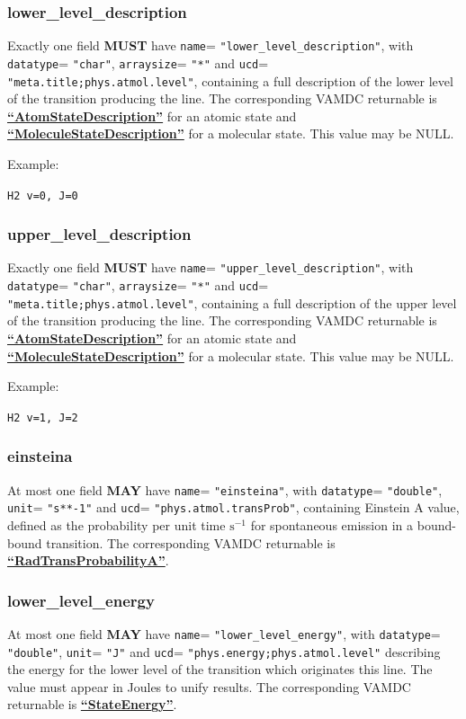 \documentclass[11pt,a4paper]{ivoa}
\def\attrval#1#2{\texttt{#1}\discretionary{}{}{}=\discretionary{}{}{}%
  \texttt{"#2"}}
\def\vamdcret#1{\href{https://dictionary.vamdc.eu/returnables/\##1}{\textbf{``\color{vamdccolor}#1''}}}
\begin{document}
\subsubsection{lower\_level\_description}

Exactly one field \textbf{MUST} have \attrval{name}{lower\_level\_description}, with \attrval{datatype}{char}, \attrval{arraysize}{*}
and \attrval{ucd}{meta.title;phys.atmol.level}, containing a full description of the lower level of the transition producing the line.
The corresponding VAMDC returnable is \vamdcret{AtomStateDescription}
for an atomic state and \vamdcret{MoleculeStateDescription} for a molecular state.
This value may be NULL.

Example:

\verb|H2 v=0, J=0|

\subsubsection{upper\_level\_description}

Exactly one field \textbf{MUST} have \attrval{name}{upper\_level\_description}, with \attrval{datatype}{char}, \attrval{arraysize}{*}
and \attrval{ucd}{meta.title;phys.atmol.level}, containing a full description of the upper level of the transition producing the line.
The corresponding VAMDC returnable is \vamdcret{AtomStateDescription}
for an atomic state and  \vamdcret{MoleculeStateDescription} for a molecular state.
This value may be NULL.

Example:

\verb|H2 v=1, J=2|

\subsubsection{einsteina}
At most one field \textbf{MAY} have \attrval{name}{einsteina}, with
\attrval{datatype}{double}, \attrval{unit}{s**-1} and \attrval{ucd}{phys.atmol.transProb}, containing Einstein A value,
defined as the probability per unit time $\textrm{s}^{-1}$ for spontaneous emission in a bound-bound transition.
The corresponding VAMDC returnable is \vamdcret{RadTransProbabilityA}.

\subsubsection{lower\_level\_energy}

At most one field \textbf{MAY} have \attrval{name}{lower\_level\_energy}, with
\attrval{datatype}{double}, \attrval{unit}{J} and \attrval{ucd}{phys.energy;phys.atmol.level}
describing the energy for the lower level of the transition which originates this line.
The value must appear in Joules to unify results.
The corresponding VAMDC returnable is \vamdcret{StateEnergy}.
\end{document}
